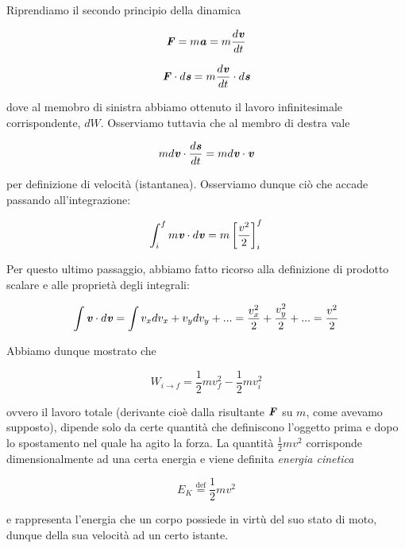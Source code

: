 Riprendiamo il secondo principio della dinamica

\[ \textbf{\textit{F}} = m \textbf{\textit{a}} = m \frac{d\textbf{\textit{v}}}{dt} \]



\[ \textbf{\textit{F}} \cdot d\textbf{\textit{s}} = m \frac{d\textbf{\textit{v}}}{dt} \cdot d\textbf{\textit{s}} \]

\noindent dove al memobro di sinistra abbiamo ottenuto il lavoro
infinitesimale corrispondente, $dW$. Osserviamo tuttavia che
al membro di destra vale

\[ m d\textbf{\textit{v}} \cdot \frac{d\textbf{\textit{s}}}{dt} = m d\textbf{\textit{v}} \cdot \textbf{\textit{v}} \]

\noindent per definizione di velocità (istantanea). Osserviamo
dunque ciò che accade passando all'integrazione:

\[ \int_{i}^{f} m \textbf{\textit{v}} \cdot d\textbf{\textit{v}} = m \left[\frac{v^2}{2}\right]_{i}^{f} \]

\noindent Per questo ultimo passaggio, abbiamo fatto ricorso alla
definizione di prodotto scalare e alle proprietà degli integrali:

\[ \int \textbf{\textit{v}} \cdot d\textbf{\textit{v}} = \int v_x dv_x + v_y dv_y + ... = \frac{v_x^2}{2} + \frac{v_y^2}{2} + ... = \frac{v^2}{2} \]

\noindent Abbiamo dunque mostrato che

\[ W_{i \to f} = \frac{1}{2}mv_f^2 - \frac{1}{2}mv_i^2 \]

\noindent ovvero il lavoro totale (derivante cioè dalla risultante
$\textbf{\textit{F}}$ su $m$, come avevamo supposto), dipende solo da
certe quantità che definiscono l'oggetto prima e dopo lo spostamento
nel quale ha agito la forza. La quantità $\frac12mv^2$ corrisponde
dimensionalmente ad una certa energia e viene definita
\textit{energia cinetica}

\[ E_K \stackrel{\text{def}}{=} \frac{1}{2}mv^2 \]

\noindent e rappresenta l'energia che un corpo possiede in
virtù del suo stato di moto, dunque della sua velocità ad un
certo istante.



